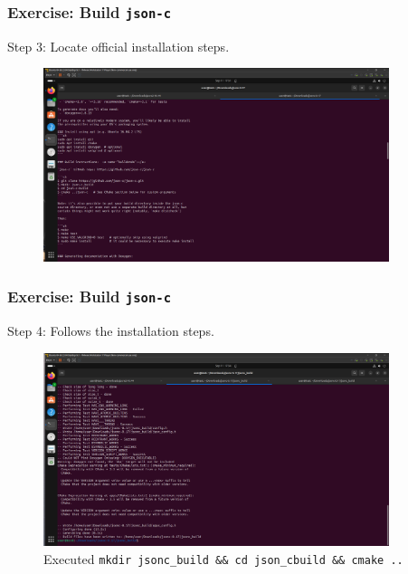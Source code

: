 \begin{frame}
    \frametitle{Exercise: Build \texttt{json-c}}

    Step 3: Locate official installation steps.

    \begin{figure}[H]
        \centering
        \includegraphics[width=0.9\textwidth]{../figure/jsonc_build_3.png}
    \end{figure}
\end{frame}

\begin{frame}
    \frametitle{Exercise: Build \texttt{json-c}}

    Step 4: Follows the installation steps.

    \begin{figure}[H]
        \centering
        \includegraphics[width=0.9\textwidth]{../figure/jsonc_build_4.png}
        \caption*{Executed \texttt{mkdir jsonc\_build \&\& cd json\_cbuild \&\& cmake ..}}
    \end{figure}
\end{frame}

